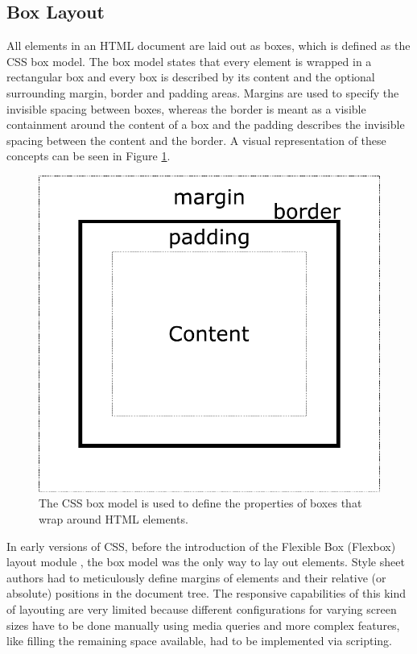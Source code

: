 \subsection{Box Layout}

All elements in an HTML document are laid out as boxes, which is
defined as the CSS box model. The box model states that every element
is wrapped in a rectangular box and every box is described by its
content and the optional surrounding margin, border and padding
areas. Margins are used to specify the invisible spacing between
boxes, whereas the border is meant as a visible containment around the
content of a box and the padding describes the invisible spacing
between the content and the border. A visual representation of these
concepts can be seen in Figure \ref{fig:BoxModel}.

\begin{figure}[tp]
    \centering
    \includegraphics[keepaspectratio,width=\linewidth,height=\fullh / 3]
    {diagrams/box-model.pdf}

    \caption[CSS Box Model]{
        The CSS box model is used to define the properties of boxes that wrap around HTML elements.
    }
    \label{fig:BoxModel}
\end{figure}

In early versions of CSS, before the introduction of the Flexible Box (Flexbox) layout module \parencite{CSSFlexboxFirstDraft}, the box model was the only way to lay out elements. Style sheet authors had to meticulously define margins of elements and their relative (or absolute) positions in the document tree. The responsive capabilities of this kind of layouting are very limited because different configurations for varying screen sizes have to be done manually using media queries and more complex features, like filling the remaining space available, had to be implemented via scripting.

